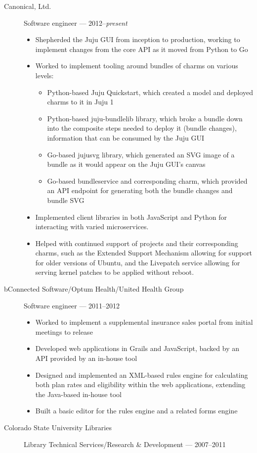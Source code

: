 \documentclass[letterpaper]{memoir}
\begin{document}
\begin{description}
\item[Canonical, Ltd.]
Software engineer --- 2012--\emph{present}

\begin{itemize}
\tightlist
\item
  Shepherded the Juju GUI from inception to production, working to implement changes from the core API as it moved from Python to Go
\item
  Worked to implement tooling around bundles of charms on various levels:

  \begin{itemize}
  \tightlist
  \item
    Python-based Juju Quickstart, which created a model and deployed charms to it in Juju 1
  \item
    Python-based juju-bundlelib library, which broke a bundle down into the composite steps needed to deploy it (bundle changes), information that can be consumed by the Juju GUI
  \item
    Go-based jujusvg library, which generated an SVG image of a bundle as it would appear on the Juju GUI's canvas
  \item
    Go-based bundleservice and corresponding charm, which provided an API endpoint for generating both the bundle changes and bundle SVG
  \end{itemize}
  \item
    Implemented client libraries in both JavaScript and Python for interacting with varied microservices.
  \item
    Helped with continued support of projects and their corresponding charms, such as the Extended Support Mechanism allowing for support for older versions of Ubuntu, and the Livepatch service allowing for serving kernel patches to be applied without reboot.
\end{itemize}
\item[bConnected Software/Optum Health/United Health Group]
Software engineer --- 2011--2012

\begin{itemize}
\tightlist
\item
  Worked to implement a supplemental insurance sales portal from initial meetings to release
\item
  Developed web applications in Grails and JavaScript, backed by an API provided by an in-house tool
\item
  Designed and implemented an XML-based rules engine for calculating both plan rates and eligibility within the web applications, extending the Java-based in-house tool
\item
  Built a basic editor for the rules engine and a related forms engine
\end{itemize}
\item[Colorado State University Libraries]
Library Technical Services/Research \& Development --- 2007--2011


\end{description}
\end{document}
